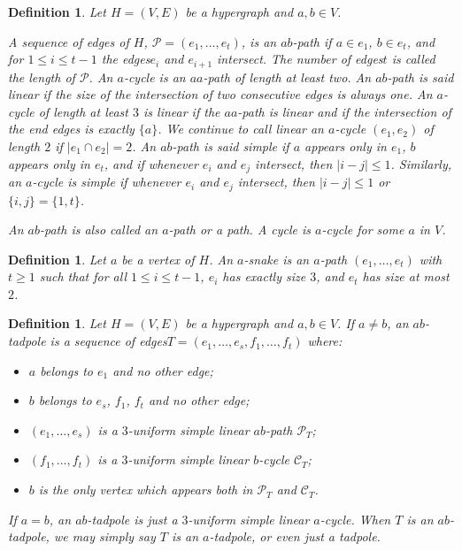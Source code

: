\documentclass{article}
\newcommand{\hyp}{H}
\newcommand{\hedge}{edge\xspace}
\newcommand{\hedges}{edges\xspace}
\newtheorem{definition}[theorem]{Definition}
\begin{document}
\begin{definition}\label{def_path_cycles}
    Let \(\hyp=(V,E)\) be a hypergraph and \(a, b \in V\). 
    
    A sequence of \hedges of \(\hyp\), \(\mathcal{P} = (e_1,\ldots,e_t)\), is an \(ab\)-{\em path} if \(a \in e_1\), \(b \in e_t\), and for \(1 \le i \le t-1\) the \hedges \(e_i\) and \(e_{i+1}\) intersect. The number of \hedges \(t\) is called the {\em length} of \(\mathcal{P}\). An \(a\)-{\em cycle} is an \(aa\)-path of length at least two. An \(ab\)-path is said {\em linear} if the size of the intersection of two consecutive \hedges is always one. An \(a\)-cycle of length at least \(3\) is {\em linear} if the \(aa\)-path is linear and if the intersection of the end \hedges is exactly \(\{a\}\). We continue to call {\em linear} an \(a\)-cycle \((e_1,e_2)\) of length \(2\) if \(\lvert e_1 \cap e_2\rvert = 2\). An \(ab\)-path is said {\em simple} if \(a\) appears only in \(e_1\), \(b\) appears only in \(e_t\), and if whenever \(e_i\) and \(e_j\) intersect, then \(\lvert i-j\rvert \le 1\). Similarly, an \(a\)-cycle is simple if whenever \(e_i\) and \(e_j\) intersect, then \(\lvert i-j\rvert \le 1\) or \(\{i,j\}=\{1,t\}\).
    
    An \(ab\)-path is also called an \(a\)-path or a path. A cycle is \(a\)-cycle for some \(a\) in \(V\). 
\end{definition}


    
\begin{definition}\label{def_snake}
    Let \(a\) be a vertex of \(\hyp\). An \(a\)-{\em snake} is an \(a\)-path \((e_1,\ldots,e_t)\) with \(t \ge 1\) such that for all \(1 \le i \le t-1\), $e_i$ has exactly size \(3\), and \(e_t\) has size at most \(2\).
\end{definition}

\begin{definition}\label{def_tadpole}
    Let \(H=(V,E)\) be a hypergraph and \(a, b \in V\). 
	If \(a\neq b\), an $ab$-{\em tadpole} is a sequence of \hedges $T=(e_1,\ldots,e_s, f_1, \ldots, f_t)$ where:
	\begin{itemize}[noitemsep,nolistsep]
		\item $a$ belongs to \(e_1\) and no other \hedge;
		\item $b$ belongs to \(e_s\), \(f_1\), \(f_t\) and no other \hedge;
		\item $(e_1,\ldots,e_s)$ is a \(3\)-uniform simple linear $ab$-path $\mathcal{P}_T$;
		\item $(f_1, \ldots, f_t)$ is a \(3\)-uniform simple linear $b$-cycle $\mathcal{C}_T$;
		\item \(b\) is the only vertex which appears both in $\mathcal{P}_T$ and $\mathcal{C}_T$.
	\end{itemize}
	If \(a=b\), an \(ab\)-tadpole is just a \(3\)-uniform simple linear \(a\)-cycle.
	When \(T\) is an \(ab\)-tadpole, we may simply say $T$ is an \(a\)-\textit{tadpole}, or even just a \textit{tadpole}.
\end{definition}
\end{document}
